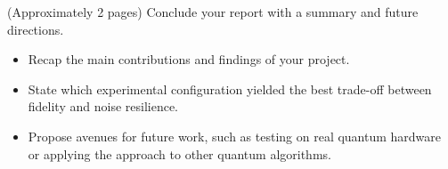 \documentclass[11pt,a4paper]{article}
\begin{document}
(Approximately 2 pages) Conclude your report with a summary and future directions.

\begin{itemize}
  \item Recap the main contributions and findings of your project.
  \item State which experimental configuration yielded the best trade-off between fidelity and noise resilience.
  \item Propose avenues for future work, such as testing on real quantum hardware or applying the approach to other quantum algorithms.
\end{itemize}

%
%
\printbibliography
\end{document}
